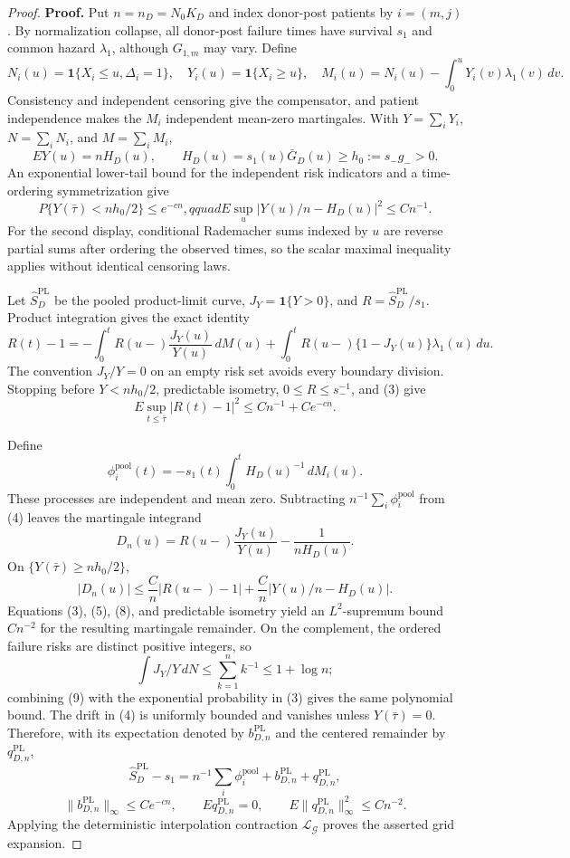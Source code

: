 \documentclass{article}
\begin{document}
\begin{proof}
\textbf{Proof.}
Put \(n=n_D=N_0K_D\) and index donor-post patients by \(i=(m,j)\). By normalization collapse, all donor-post failure times have survival \(s_1\) and common hazard \(\lambda_1\), although \(G_{1,m}\) may vary. Define
\[
 N_i(u)=\mathbf1\{X_i\le u,\Delta_i=1\},\quad
 Y_i(u)=\mathbf1\{X_i\ge u\},\quad
 M_i(u)=N_i(u)-\int_0^uY_i(v)\lambda_1(v)\,dv.            \tag{1}
\]
Consistency and independent censoring give the compensator, and patient independence makes the \(M_i\) independent mean-zero martingales. With \(Y=\sum_iY_i\), \(N=\sum_iN_i\), and \(M=\sum_iM_i\),
\[
 EY(u)=nH_D(u),\qquad H_D(u)=s_1(u)\bar G_D(u)\ge h_0:=s_-g_->0. \tag{2}
\]
An exponential lower-tail bound for the independent risk indicators and a time-ordering symmetrization give
\[
 P\{Y(\bar\tau)<nh_0/2\}\le e^{-cn},qquad
 E\sup_u|Y(u)/n-H_D(u)|^2\le Cn^{-1}.                    \tag{3}
\]
For the second display, conditional Rademacher sums indexed by \(u\) are reverse partial sums after ordering the observed times, so the scalar maximal inequality applies without identical censoring laws.

Let \(\widehat S_D^{\mathrm{PL}}\) be the pooled product-limit curve, \(J_Y=\mathbf1\{Y>0\}\), and \(R=\widehat S_D^{\mathrm{PL}}/s_1\). Product integration gives the exact identity
\[
 R(t)-1=-\int_0^tR(u-)\frac{J_Y(u)}{Y(u)}\,dM(u)
 +\int_0^tR(u-)\{1-J_Y(u)\}\lambda_1(u)\,du.             \tag{4}
\]
The convention \(J_Y/Y=0\) on an empty risk set avoids every boundary division. Stopping before \(Y<nh_0/2\), predictable isometry, \(0\le R\le s_-^{-1}\), and (3) give
\[
 E\sup_{t\le\bar\tau}|R(t)-1|^2\le Cn^{-1}+Ce^{-cn}.     \tag{5}
\]

Define
\[
 \phi_i^{\mathrm{pool}}(t)=-s_1(t)\int_0^tH_D(u)^{-1}\,dM_i(u). \tag{6}
\]
These processes are independent and mean zero. Subtracting \(n^{-1}\sum_i\phi_i^{\mathrm{pool}}\) from (4) leaves the martingale integrand
\[
 D_n(u)=R(u-)\frac{J_Y(u)}{Y(u)}-\frac1{nH_D(u)}.          \tag{7}
\]
On \(\{Y(\bar\tau)\ge nh_0/2\}\),
\[
 |D_n(u)|\le \frac{C}{n}|R(u-)-1|
 +\frac{C}{n}|Y(u)/n-H_D(u)|.                             \tag{8}
\]
Equations (3), (5), (8), and predictable isometry yield an \(L^2\)-supremum bound \(Cn^{-2}\) for the resulting martingale remainder. On the complement, the ordered failure risks are distinct positive integers, so
\[
 \int J_Y/Y\,dN\le\sum_{k=1}^nk^{-1}\le1+\log n;         \tag{9}
\]
combining (9) with the exponential probability in (3) gives the same polynomial bound. The drift in (4) is uniformly bounded and vanishes unless \(Y(\bar\tau)=0\). Therefore, with its expectation denoted by \(b_{D,n}^{\mathrm{PL}}\) and the centered remainder by \(q_{D,n}^{\mathrm{PL}}\),
\[
 \widehat S_D^{\mathrm{PL}}-s_1
 =n^{-1}\sum_i\phi_i^{\mathrm{pool}}
 +b_{D,n}^{\mathrm{PL}}+q_{D,n}^{\mathrm{PL}},             \tag{10}
\]
\[
 \|b_{D,n}^{\mathrm{PL}}\|_\infty\le Ce^{-cn},\qquad
 Eq_{D,n}^{\mathrm{PL}}=0,\qquad
 E\|q_{D,n}^{\mathrm{PL}}\|_\infty^2\le Cn^{-2}.         \tag{11}
\]
Applying the deterministic interpolation contraction \(\mathcal L_{\mathcal G}\) proves the asserted grid expansion.


\end{proof}
\end{document}
